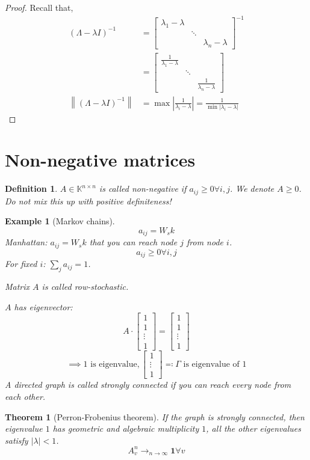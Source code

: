 \documentclass{article}
\newcounter{lecref}[section]
\numberwithin{lecref}{section}
\newtheorem{theorem}[lecref]{Theorem}
\newtheorem{example}[lecref]{Example}
\newtheorem{definition}[lecref]{Definition}
\newcommand{\norm}[1]{\left\|#1\right\|}
\newcommand{\card}[1]{\left|#1\right|}
\begin{document}
\begin{proof}
  Recall that,
  \begin{align*}
    (\Lambda - \lambda I)^{-1}
      &= \begin{bmatrix} \lambda_1 - \lambda & & \\ & \ddots & \\ & & \lambda_n - \lambda \end{bmatrix}^{-1} \\
      &= \begin{bmatrix} \frac{1}{\lambda_1 - \lambda} & & \\ & \ddots & \\ & & \frac{1}{\lambda_n - \lambda} \end{bmatrix} \\
    \norm{(\Lambda - \lambda I)^{-1}} &= \max\card{\frac{1}{\lambda_i - \lambda}} = \frac{1}{\min\card{\lambda_i - \lambda}}
  \end{align*}
\end{proof}

\section{Non-negative matrices}

\begin{definition} %
  $A \in \mathbb K^{n \times n}$ is called \emph{non-negative}
  if $a_{ij} \geq 0 \forall i,j$. We denote $A \geq 0$.
  Do not mix this up with positive definiteness!
\end{definition}

\begin{example}[Markov chains]
  \[ a_{ij} = W_s k \]
  Manhattan: $a_{ij} = W_s k$ that you can reach node $j$ from node $i$.
  \[ a_{ij} \geq 0 \forall i,j \]
  For fixed $i$: $\sum_j a_{ij} = 1$.

  Matrix $A$ is called \emph{row-stochastic}.

  $A$ has eigenvector:
  \[ A \cdot \begin{bmatrix} 1 \\ 1 \\ \vdots \\ 1 \end{bmatrix} = \begin{bmatrix} 1 \\ 1 \\ \vdots \\ 1 \end{bmatrix} \]
  \[ \implies 1 \text{ is eigenvalue}, \begin{bmatrix} 1 \\ \vdots \\ 1 \end{bmatrix} \eqqcolon \Gamma \text{ is eigenvalue of } 1 \]
  A directed graph is called \emph{strongly connected} if you can reach every node from each other.
\end{example}

\begin{theorem}[Perron-Frobenius theorem]
  If the graph is strongly connected, then eigenvalue $1$ has geometric and algebraic multiplicity $1$,
  all the other eigenvalues satisfy $\card{\lambda} < 1$.
  \[ A_v^n \to_{n \to \infty} \mathbf 1 \forall v \]
\end{theorem}

\printindex
\end{document}
